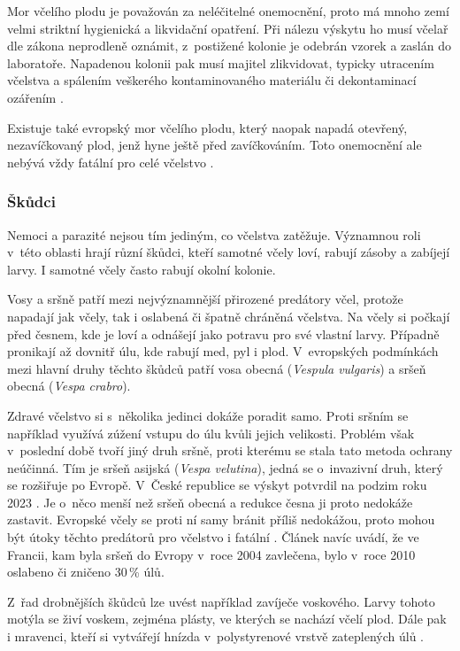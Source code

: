 Mor včelího plodu je považován za neléčitelné onemocnění, proto má mnoho zemí velmi striktní hygienická a likvidační opatření. Při nálezu výskytu ho musí včelař dle zákona neprodleně oznámit, z~postižené kolonie je odebrán vzorek a zaslán do laboratoře. Napadenou kolonii pak musí majitel zlikvidovat, typicky utracením včelstva a spálením veškerého kontaminovaného materiálu či dekontaminací ozářením \cite{csvMor}.

Existuje také evropský mor včelího plodu, který naopak napadá otevřený, nezavíčkovaný plod, jenž hyne ještě před zavíčkováním. Toto onemocnění ale nebývá vždy fatální pro celé včelstvo \cite{Ritter}.

\subsubsection*{Škůdci}
Nemoci a parazité nejsou tím jediným, co včelstva zatěžuje. Významnou roli v~této oblasti hrají různí škůdci, kteří samotné včely loví, rabují zásoby a zabíjejí larvy. I samotné včely často rabují okolní kolonie.

Vosy a sršně patří mezi nejvýznamnější přirozené predátory včel, protože napadají jak včely, tak i oslabená či špatně chráněná včelstva. Na včely si počkají před česnem, kde je loví a odnášejí jako potravu pro své vlastní larvy. Případně pronikají až dovnitř úlu, kde rabují med, pyl i plod. V~evropských podmínkách mezi hlavní druhy těchto škůdců patří vosa obecná (\textit{Vespula vulgaris}) a sršeň obecná (\textit{Vespa crabro}). 

Zdravé včelstvo si s~několika jedinci dokáže poradit samo. Proti sršním se například využívá zúžení vstupu do úlu kvůli jejich velikosti. Problém však v~poslední době tvoří jiný druh sršně, proti kterému se stala tato metoda ochrany neúčinná. Tím je sršeň asijská (\textit{Vespa velutina}), jedná se o~invazivní druh, který se rozšiřuje po Evropě. V~České republice se výskyt potvrdil na podzim roku 2023 \cite{svscrSrsenAsijska}. Je o~něco menší než sršeň obecná a redukce česna ji proto nedokáže zastavit. Evropské včely se proti ní samy bránit příliš nedokážou, proto mohou být útoky těchto predátorů pro včelstvo i fatální \cite{monceau2014}. Článek navíc uvádí, že ve Francii, kam byla sršeň do Evropy v~roce 2004 zavlečena, bylo v~roce 2010 oslabeno či zničeno 30\,\% úlů.

Z~řad drobnějších škůdců lze uvést například zavíječe voskového. Larvy tohoto motýla se živí voskem, zejména plásty, ve kterých se nachází včelí plod. Dále pak i mravenci, kteří si vytvářejí hnízda v~polystyrenové vrstvě zateplených úlů \cite{Ritter}.

